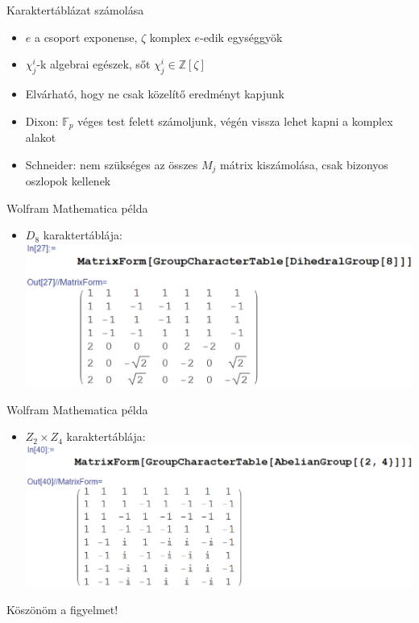 \documentclass[mathserif]{beamer}
\begin{document}
\begin{frame}{Karaktertáblázat számolása}
\begin{itemize}
\item $e$ a csoport exponense, $\zeta$ komplex $e$-edik egységgyök
\item $\chi^i_j$-k algebrai egészek, sőt $\chi^i_j \in \mathbb{Z}[\zeta]$
\item Elvárható, hogy ne csak közelítő eredményt kapjunk
\item Dixon: $\mathbb{F}_p$ véges test felett számoljunk, végén vissza lehet kapni a komplex alakot
\item Schneider: nem szükséges az összes $M_j$ mátrix kiszámolása, csak bizonyos oszlopok kellenek
\end{itemize}
\end{frame}

\begin{frame}{Wolfram Mathematica példa}
\begin{itemize}
\item $D_8$ karaktertáblája:
\includegraphics[scale=0.25]{d8}
\end{itemize}
\end{frame}

\begin{frame}{Wolfram Mathematica példa}
\begin{itemize}
\item $Z_2\times Z_4$ karaktertáblája:
\includegraphics[scale=0.25]{z2z4}
\end{itemize}
\end{frame}

\begin{frame}{}
\hfill\huge{Köszönöm a figyelmet!}\hfill\hfill
\end{frame}
\end{document}
